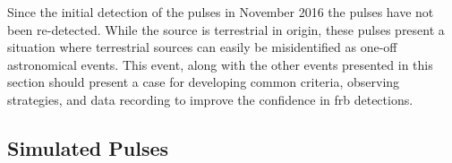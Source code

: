\documentclass[a4paper,fleqn,usenatbib]{mnras}
\begin{document}
Since the initial detection of the pulses in November 2016 the pulses have not
been re-detected. While the source is terrestrial in origin, these pulses
present a situation where terrestrial sources can easily be misidentified as
one-off astronomical events. This event, along with the other events presented
in this section should present a case for developing common criteria, observing
strategies, and data recording to improve the confidence in \gls{frb}
detections.

\subsection{Simulated Pulses}
\label{sec:sim_pulses}


%
%
%
%
\end{document}
